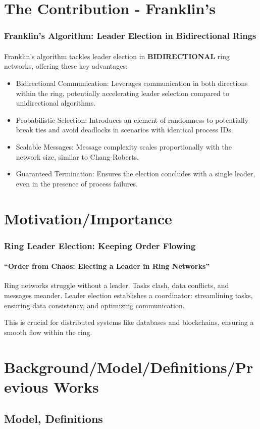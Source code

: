 \documentclass[11pt]{beamer}              %
\begin{document}
\section{The Contribution - Franklin's}
\begin{frame}
\frametitle{Franklin's Algorithm: Leader Election in Bidirectional Rings}
\framesubtitle{}
Franklin's algorithm tackles leader election in \textbf{BIDIRECTIONAL} ring networks, offering these key advantages:
\begin{itemize}
\item Bidirectional Communication: Leverages communication in both directions within the ring, potentially accelerating leader selection compared to unidirectional algorithms.
\item Probabilistic Selection: Introduces an element of randomness to potentially break ties and avoid deadlocks in scenarios with identical process IDs.
\item Scalable Messages: Message complexity scales proportionally with the network size, similar to Chang-Roberts.
\item Guaranteed Termination: Ensures the election concludes with a single leader, even in the presence of process failures.
\end{itemize}
\end{frame}


\section{Motivation/Importance}
\begin{frame}
\frametitle{Ring Leader Election: Keeping Order Flowing}
\framesubtitle{``Order from Chaos: Electing a Leader in Ring Networks''}
Ring networks struggle without a leader. Tasks clash, data conflicts, and messages meander.
Leader election establishes a coordinator: streamlining tasks, ensuring data consistency, and optimizing communication.

This is crucial for distributed systems like databases and blockchains, ensuring a smooth flow within the ring.\end{frame}

\section{Background/Model/Definitions/Previous Works}


\subsection{Model, Definitions}
\end{document}
